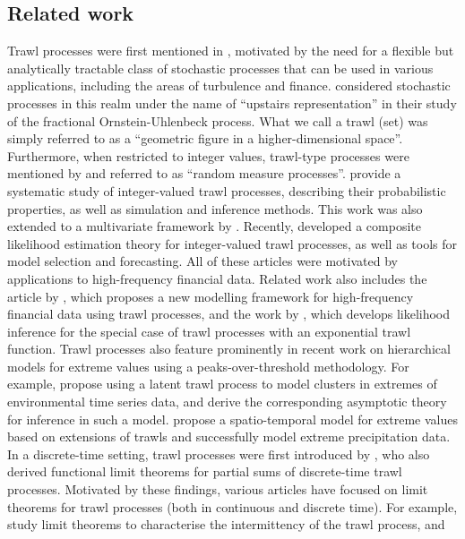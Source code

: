\documentclass{article}
\theoremstyle{plain}
\theoremstyle{definition}
\theoremstyle{remark}
\begin{document}
\subsection{Related work}
Trawl processes were first mentioned in \cite{BN2011}, motivated by the need for a flexible but analytically tractable class of stochastic processes that can be used in various applications, including the areas of turbulence and finance. 
\cite{WolpertTaqqu2005} considered stochastic processes in this realm under the name of ``upstairs representation'' in their study of the fractional Ornstein-Uhlenbeck process. What we call a trawl (set) was simply referred to as a ``geometric figure in a higher-dimensional space''. Furthermore, when restricted to integer values, trawl-type processes were mentioned by \cite{WolpertBrown2012} and referred to as ``random measure processes''. 
\cite{BNLSV2014} provide a systematic study of integer-valued trawl processes, describing their probabilistic properties, as well as simulation and inference methods.
This work was also extended to a multivariate framework by \cite{VERAART2019}. Recently, \cite{BLSV2021} developed a composite likelihood estimation theory for integer-valued trawl processes, as well as tools for model selection and forecasting.
All of these articles were motivated by applications to high-frequency financial data.
Related work also includes the article by \cite{SheYan}, which proposes a new modelling framework for high-frequency financial data using trawl processes, and the work by  \cite{Shephard2016}, which develops likelihood inference for the special case of trawl processes with an exponential trawl function.
Trawl processes also feature prominently in recent work on hierarchical models for extreme values using a peaks-over-threshold methodology.  
For example, \cite{Noven} propose using a latent trawl process
to model clusters in extremes of environmental time series data, and
\cite{CourgeauVeraart2022} derive the corresponding asymptotic theory for inference in such a model.
\cite{Bacro} propose a spatio-temporal model for extreme values based on extensions of trawls and successfully model extreme 
precipitation data. 
In a discrete-time setting, trawl processes were first introduced by \cite{DoukJakLopSurg18}, who also derived functional limit theorems for partial sums of discrete-time trawl processes. Motivated by these findings, various articles have focused on limit theorems for trawl processes (both in continuous and discrete time).
For example, \cite{GRAHOVAC2018235} study limit theorems to characterise the intermittency of the trawl process, and \cite{Paulau}
\end{document}
